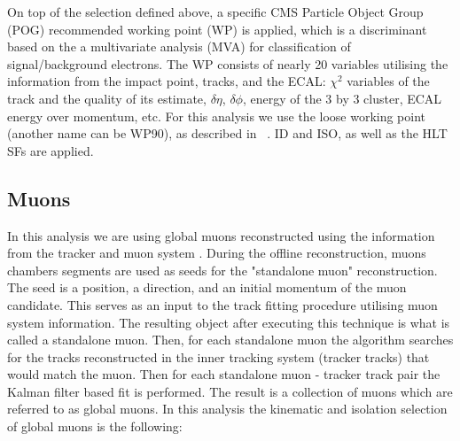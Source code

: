         On top of the selection defined above, a specific CMS Particle Object Group (POG) recommended working point (WP) is applied, which is a discriminant based on the a multivariate analysis (MVA) for classification of signal/background electrons. The WP consists of nearly 20 variables utilising the information from the impact point, tracks, and the ECAL: $\chi^2$ variables of the track and the quality of its estimate, $\delta \eta$, $\delta \phi$, energy of the 3 by 3 cluster, ECAL energy over momentum, etc. For this analysis we use the loose working point (another name can be WP90), as described in ~\cite{vhbbAN}. ID and ISO, as well as the HLT SFs are applied.



\subsection{Muons\label{sec:muons}}
        In this analysis we are using global muons reconstructed using the information from the tracker and muon system \cite{CMS-PAS-MUO-10-002,Chatrchyan:2012xi}. During the offline reconstruction, muons chambers segments are used as seeds for the "standalone muon" reconstruction. The seed is a position, a direction, and an initial momentum of the muon candidate. This serves as an input to the track fitting procedure utilising muon system information. The resulting object after executing this technique is what is called a standalone muon. Then, for each standalone muon the algorithm searches for the tracks reconstructed in the inner tracking system (tracker tracks) that would match the muon. Then for each standalone muon - tracker track pair the Kalman filter based fit \cite{Lenzi:2013xpa} is performed. The result is a collection of muons which are referred to as global muons. In this analysis the kinematic and isolation selection of global muons is the following:
        
